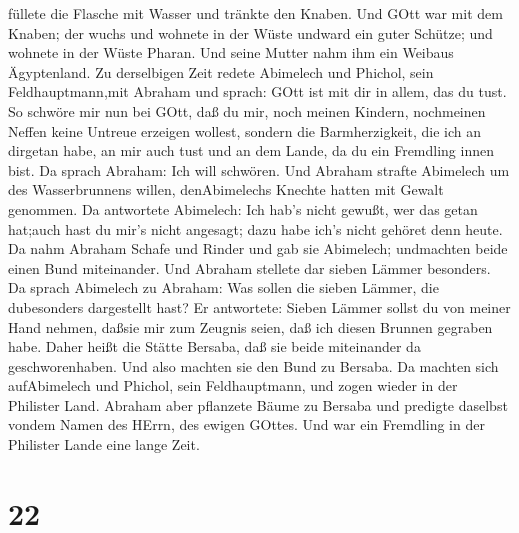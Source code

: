füllete die Flasche mit Wasser und tränkte den Knaben.  Und
GOtt war mit dem Knaben; der wuchs und wohnete in der Wüste undward ein
guter Schütze;  und wohnete in der Wüste Pharan. Und seine
Mutter nahm ihm ein Weibaus Ägyptenland.  Zu derselbigen
Zeit redete Abimelech und Phichol, sein Feldhauptmann,mit Abraham und
sprach: GOtt ist mit dir in allem, das du tust.  So schwöre
mir nun bei GOtt, daß du mir, noch meinen Kindern, nochmeinen Neffen
keine Untreue erzeigen wollest, sondern die Barmherzigkeit, die ich an
dirgetan habe, an mir auch tust und an dem Lande, da du ein Fremdling
innen bist.  Da sprach Abraham: Ich will schwören.
 Und Abraham strafte Abimelech um des Wasserbrunnens
willen, denAbimelechs Knechte hatten mit Gewalt genommen. 
Da antwortete Abimelech: Ich hab's nicht gewußt, wer das getan hat;auch
hast du mir's nicht angesagt; dazu habe ich's nicht gehöret denn heute.
 Da nahm Abraham Schafe und Rinder und gab sie Abimelech;
undmachten beide einen Bund miteinander.  Und Abraham
stellete dar sieben Lämmer besonders.  Da sprach Abimelech
zu Abraham: Was sollen die sieben Lämmer, die dubesonders dargestellt
hast?  Er antwortete: Sieben Lämmer sollst du von meiner
Hand nehmen, daßsie mir zum Zeugnis seien, daß ich diesen Brunnen
gegraben habe.  Daher heißt die Stätte Bersaba, daß sie
beide miteinander da geschworenhaben.  Und also machten sie
den Bund zu Bersaba. Da machten sich aufAbimelech und Phichol, sein
Feldhauptmann, und zogen wieder in der Philister Land. 
Abraham aber pflanzete Bäume zu Bersaba und predigte daselbst vondem
Namen des HErrn, des ewigen GOttes.  Und war ein Fremdling
in der Philister Lande eine lange Zeit.

\hypertarget{section-21}{%
\section{22}\label{section-21}}

